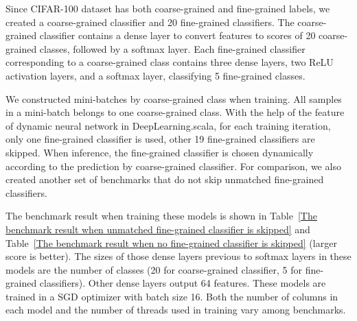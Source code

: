 Since CIFAR-100 dataset has both coarse-grained and fine-grained labels, we created a coarse-grained classifier and 20 fine-grained classifiers. The coarse-grained classifier contains a dense layer to convert features to scores of 20 coarse-grained classes, followed by a softmax layer. Each fine-grained classifier corresponding to a coarse-grained class contains three dense layers, two ReLU activation layers, and a softmax layer, classifying 5 fine-grained classes.

We constructed mini-batches by coarse-grained class when training. All samples in a mini-batch belongs to one coarse-grained class. With the help of the feature of dynamic neural network in DeepLearning.scala, for each training iteration, only one fine-grained classifier is used, other 19 fine-grained classifiers are skipped. When inference, the fine-grained classifier is chosen dynamically according to the prediction by coarse-grained classifier. For comparison, we also created another set of benchmarks that do not skip unmatched fine-grained classifiers.


The benchmark result when training these models is shown in Table~\ref{The benchmark result when unmatched fine-grained classifier is skipped} and Table~\ref{The benchmark result when no fine-grained classifier is skipped} (larger score is better). The sizes of those dense layers previous to softmax layers in these models are the number of classes (20 for coarse-grained classifier, 5 for fine-grained classifiers). Other dense layers output 64 features. These models are trained in a SGD optimizer with batch size 16. Both the number of columns in each model and the number of threads used in training vary among benchmarks.

